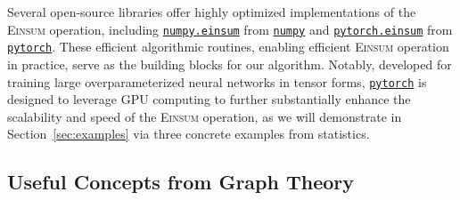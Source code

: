 \documentclass[letterpaper,11pt]{article}
\newcommand{\Lin}[1]{{\color{purple}{Lin: #1}}}
\def\Einsum{\textsc{Einsum}}
\newcommand{\libref}[2]{\href{#2}{\texttt{#1}}}
\newcommand{\numpy}{\libref{numpy}{https://numpy.org/}}
\newcommand{\torch}{\libref{pytorch}{https://pytorch.org/}}
\newcommand{\tensorcontraction}{\textsc{Einsum}}
\newcommand{\numpyeinsum}{\libref{numpy.einsum}{https://numpy.org/doc/2.1/reference/generated/numpy.einsum.html}}
\newcommand{\torcheinsum}{\libref{pytorch.einsum}{https://pytorch.org/docs/stable/generated/torch.einsum.html}}
\begin{document}
\begin{bibunit}[plainnat]
\begin{remark}
\label{rem:libraries}
Several open-source libraries offer highly optimized implementations of the \Einsum{} operation, including \numpyeinsum{} from \numpy{} and \torcheinsum{} from \torch{}. These efficient algorithmic routines, enabling efficient \Einsum{} operation in practice, serve as the building blocks for our algorithm. Notably, developed for training large overparameterized neural networks in tensor forms, \torch{} is designed to leverage GPU computing to further substantially enhance the scalability and speed of the \Einsum{} operation, as we will demonstrate in Section~\ref{sec:examples} via three concrete examples from statistics.
\end{remark}
\fi

\subsection{Useful Concepts from Graph Theory}
\label{sec:graph}


\end{bibunit}
\end{document}
